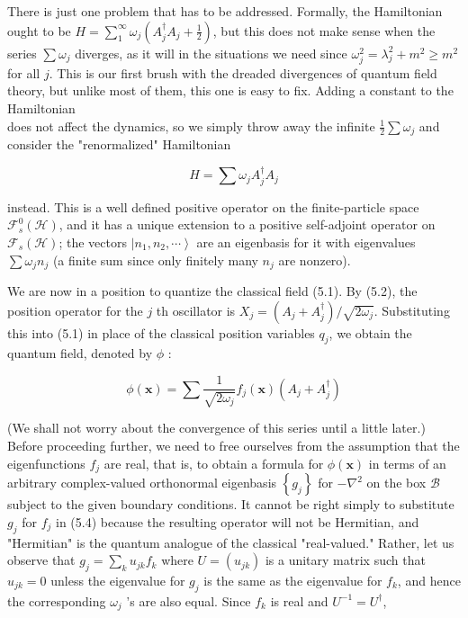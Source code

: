 \documentclass[10pt, letterpaper]{article}
\begin{document}
There is just one problem that has to be addressed. Formally, the Hamiltonian ought to be $H=\sum_{1}^{\infty} \omega_{j}\left(A_{j}^{\dagger} A_{j}+\frac{1}{2}\right)$, but this does not make sense when the series $\sum \omega_{j}$ diverges, as it will in the situations we need since $\omega_{j}^{2}=\lambda_{j}^{2}+m^{2} \geq m^{2}$ for all $j$. This is our first brush with the dreaded divergences of quantum field theory, but unlike most of them, this one is easy to fix. Adding a constant to the Hamiltonian\\
does not affect the dynamics, so we simply throw away the infinite $\frac{1}{2} \sum \omega_{j}$ and consider the "renormalized" Hamiltonian

$$
H=\sum \omega_{j} A_{j}^{\dagger} A_{j}
$$

instead. This is a well defined positive operator on the finite-particle space $\mathcal{F}_{s}^{0}(\mathcal{H})$, and it has a unique extension to a positive self-adjoint operator on $\mathcal{F}_{s}(\mathcal{H})$; the vectors $\left|n_{1}, n_{2}, \cdots\right\rangle$ are an eigenbasis for it with eigenvalues $\sum \omega_{j} n_{j}$ (a finite sum since only finitely many $n_{j}$ are nonzero).

We are now in a position to quantize the classical field (5.1). By (5.2), the position operator for the $j$ th oscillator is $X_{j}=\left(A_{j}+A_{j}^{\dagger}\right) / \sqrt{2 \omega_{j}}$. Substituting this into (5.1) in place of the classical position variables $q_{j}$, we obtain the quantum field, denoted by $\phi$ :

$$
\phi(\mathbf{x})=\sum \frac{1}{\sqrt{2 \omega_{j}}} f_{j}(\mathbf{x})\left(A_{j}+A_{j}^{\dagger}\right)
$$

(We shall not worry about the convergence of this series until a little later.)\\
Before proceeding further, we need to free ourselves from the assumption that the eigenfunctions $f_{j}$ are real, that is, to obtain a formula for $\phi(\mathbf{x})$ in terms of an arbitrary complex-valued orthonormal eigenbasis $\left\{g_{j}\right\}$ for $-\nabla^{2}$ on the box $\mathcal{B}$ subject to the given boundary conditions. It cannot be right simply to substitute $g_{j}$ for $f_{j}$ in (5.4) because the resulting operator will not be Hermitian, and "Hermitian" is the quantum analogue of the classical "real-valued." Rather, let us observe that $g_{j}=\sum_{k} u_{j k} f_{k}$ where $U=\left(u_{j k}\right)$ is a unitary matrix such that $u_{j k}=0$ unless the eigenvalue for $g_{j}$ is the same as the eigenvalue for $f_{k}$, and hence the corresponding $\omega_{j}$ 's are also equal. Since $f_{k}$ is real and $U^{-1}=U^{\dagger}$,
\end{document}
